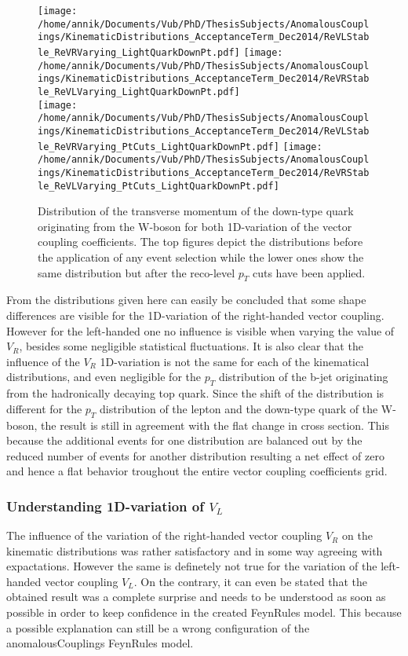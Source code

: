 \begin{figure}[!h]
 \centering
 \texttt{[image: /home/annik/Documents/Vub/PhD/ThesisSubjects/AnomalousCouplings/KinematicDistributions\_AcceptanceTerm\_Dec2014/ReVLStable\_ReVRVarying\_LightQuarkDownPt.pdf]}
 \texttt{[image: /home/annik/Documents/Vub/PhD/ThesisSubjects/AnomalousCouplings/KinematicDistributions\_AcceptanceTerm\_Dec2014/ReVRStable\_ReVLVarying\_LightQuarkDownPt.pdf]}\\
 \texttt{[image: /home/annik/Documents/Vub/PhD/ThesisSubjects/AnomalousCouplings/KinematicDistributions\_AcceptanceTerm\_Dec2014/ReVLStable\_ReVRVarying\_PtCuts\_LightQuarkDownPt.pdf]}
 \texttt{[image: /home/annik/Documents/Vub/PhD/ThesisSubjects/AnomalousCouplings/KinematicDistributions\_AcceptanceTerm\_Dec2014/ReVRStable\_ReVLVarying\_PtCuts\_LightQuarkDownPt.pdf]}
 \caption{Distribution of the transverse momentum of the down-type quark originating from the W-boson for both 1D-variation of the vector coupling coefficients. The top figures depict the distributions before the application of any event selection while the lower ones show the same distribution but after the reco-level $p_T$ cuts have been applied.}
 \label{fig::KinChangeDownQPt}
\end{figure}

From the distributions given here can easily be concluded that some shape differences are visible for the 1D-variation of the right-handed vector coupling. However for the left-handed one no influence is visible when varying the value of $V_R$, besides some negligible statistical fluctuations. It is also clear that the influence of the $V_R$ 1D-variation is not the same for each of the kinematical distributions, and even negligible for the $p_T$ distribution of the b-jet originating from the hadronically decaying top quark. Since the shift of the distribution is different for the $p_T$ distribution of the lepton and the down-type quark of the W-boson, the result is still in agreement with the flat change in cross section. This because the additional events for one distribution are balanced out by the reduced number of events for another distribution resulting a net effect of zero and hence a flat behavior troughout the entire vector coupling coefficients grid.

\subsubsection{Understanding 1D-variation of $V_L$}
The influence of the variation of the right-handed vector coupling $V_R$ on the kinematic distributions was rather satisfactory and in some way agreeing with expactations. However the same is definetely not true for the variation of the left-handed vector coupling $V_L$. On the contrary, it can even be stated that the obtained result was a complete surprise and needs to be understood as soon as possible in order to keep confidence in the created FeynRules model. This because a possible explanation can still be a wrong configuration of the anomalousCouplings FeynRules model.

